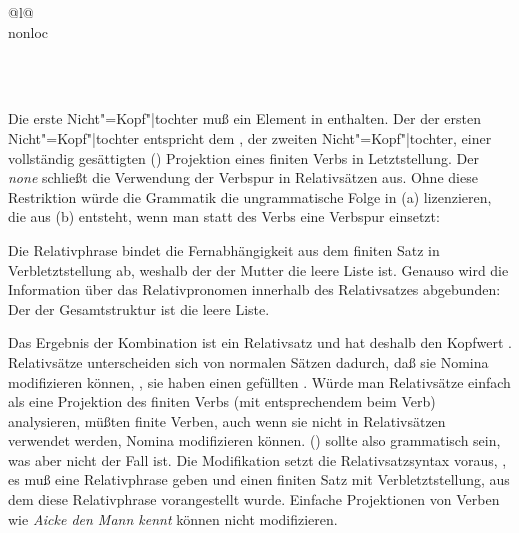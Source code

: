 \begin{samepage}
\begin{schema}
{{\begin{tabular}{@{}l@{}}
{{                                                                     } \\
                                                 nonloc  \\
                                               } \\
                            \end{tabular}
                         } \\
}%
\end{schema}
\end{samepage}
%
Die erste Nicht"=Kopf"|tochter muß ein Element in \rel enthalten. Der \localw der ersten
Nicht"=Kopf"|tochter  entspricht dem \slashw, der zweiten Nicht"=Kopf"|tochter, einer
vollständig gesättigten (\subcat \eliste) Projektion eines finiten Verbs in Letztstellung. Der \dslw
\emph{none} schließt die Verwendung der Verbspur in Relativsätzen aus. Ohne diese Restriktion würde
die Grammatik die ungrammatische Folge in (a) lizenzieren, die aus (b) entsteht, wenn
man statt des Verbs eine Verbspur einsetzt:
\eal
{}
\zl

\noindent
Die Relativphrase bindet die Fernabhängigkeit aus dem finiten Satz in Verbletztstellung ab,
weshalb der \slashw der Mutter die leere Liste ist. Genauso wird die Information über das
Relativpronomen innerhalb des Relativsatzes abgebunden: Der \relw der Gesamtstruktur ist die leere Liste. 

Das Ergebnis der Kombination ist ein Relativsatz und hat deshalb den Kopfwert
.\label{Erklaerung-relativizer} Relativsätze unterscheiden sich von normalen Sätzen dadurch, daß sie Nomina
modifizieren können, \dash, sie haben einen gefüllten \modw. Würde man Relativsätze einfach als eine
Projektion des finiten Verbs (mit entsprechendem \modw beim Verb) analysieren, müßten finite Verben,
auch wenn sie nicht in Relativsätzen verwendet werden, Nomina modifizieren können. () sollte
also grammatisch sein, was aber nicht der Fall ist.
\z
Die Modifikation setzt die Relativsatzsyntax voraus, \dash, es muß eine Relativphrase geben und einen
finiten Satz mit Verbletztstellung, aus dem diese Relativphrase vorangestellt wurde. Einfache
Projektionen von Verben wie \emph{Aicke den Mann kennt} können nicht modifizieren.


